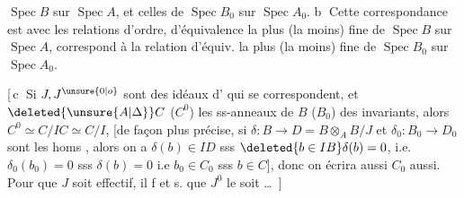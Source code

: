 $\operatorname{Spec} B$ sur $\operatorname{Spec} A$, et celles de $\operatorname{Spec} B_0$ sur $\operatorname{Spec} A_0$. \textcircled{b} Cette correspondance est  avec les relations d'ordre,   d'équivalence la plus (la moins) fine de  $\operatorname{Spec} B$ sur $\operatorname{Spec} A$, correspond à la relation d'équiv. la plus (la moins) fine de $\operatorname{Spec} B_0$ sur $\operatorname{Spec} A_0$.

[\,\textcircled{c} Si $J,J^{\unsure{0|o}}$ sont des idéaux d' qui se correspondent, et $\deleted{\unsure{A|\Delta}} C$ ($C^0$) les ss-anneaux de $B$ ($B_0$) des invariants, alors $C^0\simeq C/IC\simeq C/I$, [de façon plus précise, si $\delta:B\longrightarrow D=B\otimes_A B/J$ et $\delta_0:B_0\longrightarrow D_0$ sont les homs , alors on a
$\delta(b)\in ID$ sss $\deleted{b\in IB}\delta(b)=0$, i.e. $\delta_0(b_0)=0$ sss $\delta(b)=0$ i.e $b_0\in C_0$ sss $b\in C$], donc on écrira aussi $C_0$ aussi. Pour que $J$ soit effectif, il f et s. que $J^0$ le soit \ldots\ ]

